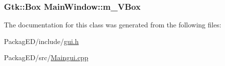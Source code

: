 \subsubsection[{\texorpdfstring{m\+\_\+\+V\+Box}{m_VBox}}]{\setlength{\rightskip}{0pt plus 5cm}Gtk\+::\+Box Main\+Window\+::m\+\_\+\+V\+Box\hspace{0.3cm}{\ttfamily [private]}}\hypertarget{class_main_window_a4c78dd9410eb57879f400e1e05bb5043}{}\label{class_main_window_a4c78dd9410eb57879f400e1e05bb5043}


The documentation for this class was generated from the following files\+:\begin{DoxyCompactItemize}
\item 
Packag\+E\+D/include/\hyperlink{gui_8h}{gui.\+h}\item 
Packag\+E\+D/src/\hyperlink{_maingui_8cpp}{Maingui.\+cpp}\end{DoxyCompactItemize}
